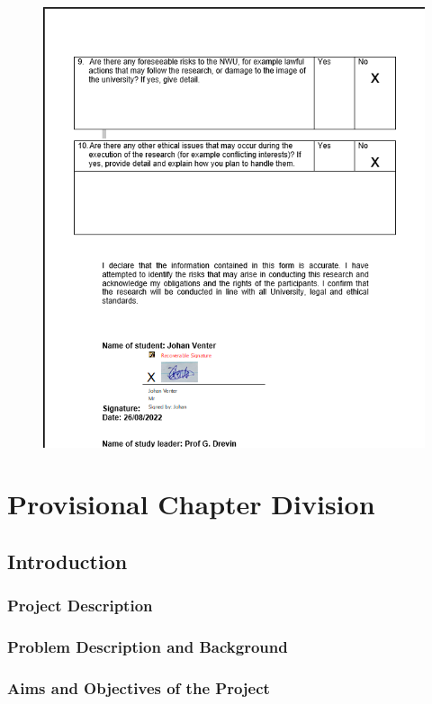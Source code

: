 \documentclass[a4paper, 12pt]{report}
\begin{document}
\begin{figure}
    \includegraphics[width=\linewidth]{ethics3.png}
    \label{fig:ethics3}
\end{figure}

\section{Provisional Chapter Division}
\subsection{Introduction}
\subsubsection{Project Description}
\subsubsection{Problem Description and Background}
\subsubsection{Aims and Objectives of the Project}
\end{document}
